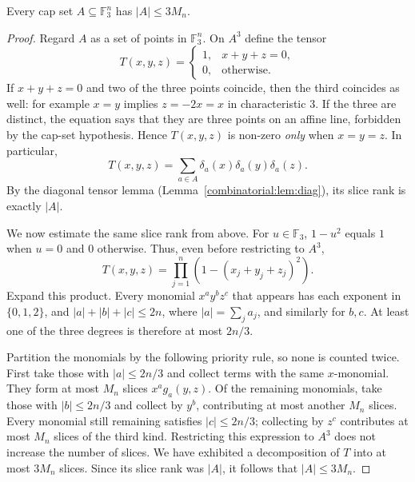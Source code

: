 \begin{theorem}\label{combinatorial:thm:capset}
Every cap set $A\subseteq\mathbb F_3^n$ has $|A|\le3M_n$.
\end{theorem}
\begin{proof}
Regard $A$ as a set of points in $\mathbb F_3^n$.
On $A^3$ define the tensor
\[
T(x,y,z)=
\begin{cases}
1,&x+y+z=0,\\
0,&\text{otherwise}.
\end{cases}
\]
If $x+y+z=0$ and two of the three points
coincide, then the third coincides as well:
for example $x=y$ implies $z=-2x=x$
in characteristic $3$. If the three are
distinct, the equation says that they are
three points on an affine line, forbidden
by the cap-set hypothesis. Hence
$T(x,y,z)$ is non-zero \emph{only} when
$x=y=z$. In particular,
\[
T(x,y,z)=
\sum_{a\in A}\delta_a(x)\delta_a(y)\delta_a(z).
\]
By the diagonal tensor lemma
(Lemma~\ref{combinatorial:lem:diag}),
its slice rank is exactly $|A|$.

We now estimate the same slice rank from above.
For $u\in\mathbb F_3$, $1-u^2$ equals $1$
when $u=0$ and $0$ otherwise. Thus, even
before restricting to $A^3$,
\[
T(x,y,z)=\prod_{j=1}^n
  \left(1-(x_j+y_j+z_j)^2\right).
\]
Expand this product. Every monomial
$x^ay^bz^c$ that appears has each exponent
in $\{0,1,2\}$, and
$|a|+|b|+|c|\le2n$, where
$|a|=\sum_j a_j$, and similarly for $b,c$.
At least one of the three degrees is
therefore at most $2n/3$.

Partition the monomials by the following
priority rule, so none is counted twice.
First take those with $|a|\le2n/3$ and
collect terms with the same $x$-monomial.
They form at most $M_n$ slices
$x^a g_a(y,z)$. Of the remaining
monomials, take those with $|b|\le2n/3$
and collect by $y^b$, contributing at
most another $M_n$ slices. Every monomial
still remaining satisfies $|c|\le2n/3$;
collecting by $z^c$ contributes at most
$M_n$ slices of the third kind.
Restricting this expression to $A^3$
does not increase the number of slices.
We have exhibited a decomposition of $T$
into at most $3M_n$ slices. Since its
slice rank was $|A|$, it follows that
$|A|\le3M_n$.
\end{proof}

